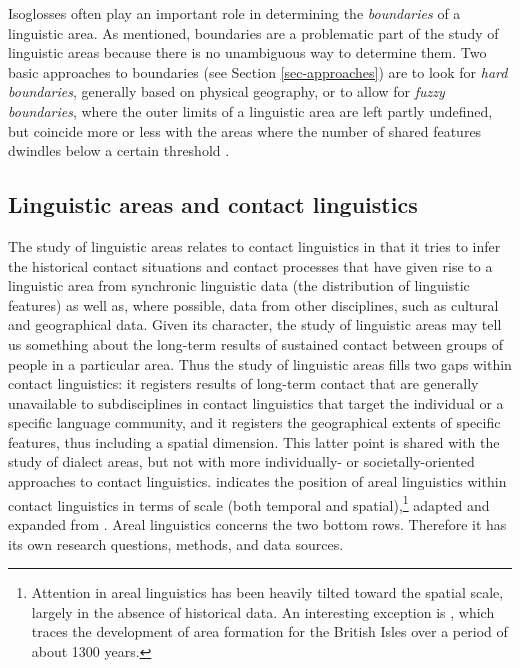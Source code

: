 \documentclass[output=paper]{langscibook}
\begin{document}
Isoglosses often play an important role in determining the \textit{boundaries} of a linguistic area. As mentioned, boundaries are a problematic part of the study of linguistic areas because there is no unambiguous way to determine them. Two basic approaches to boundaries (see Section \ref{sec-approaches}) are to look for \textit{hard boundaries}, generally based on physical geography, or to allow for \textit{fuzzy boundaries}, where the outer limits of a linguistic area are left partly undefined, but coincide more or less with the areas where the number of shared features dwindles below a certain threshold \parencite{Muyskenetal2014Linguistic}.

\subsection{Linguistic areas and contact linguistics} \label{subsec:linguistic areas and contact linguistics}

The study of linguistic areas relates to contact linguistics in that it tries to infer the historical contact situations and contact processes that have given rise to a linguistic area from synchronic linguistic data (the distribution of linguistic features) as well as, where possible, data from other disciplines, such as cultural and geographical data. Given its character, the study of linguistic areas may tell us something about the long-term results of sustained contact between groups of people in a particular area. Thus the study of linguistic areas fills two gaps within contact linguistics: it registers results of long-term contact that are generally unavailable to subdisciplines in contact linguistics that target the individual or a specific language community, and it registers the geographical extents of specific features, thus including a spatial dimension. This latter point is shared with the study of dialect areas,
but not with more individually- or societally-oriented approaches to contact linguistics.  indicates the position of areal linguistics within contact linguistics in terms of scale (both temporal and spatial),\footnote{Attention in areal linguistics has been heavily tilted toward the spatial scale, largely in the absence of historical data. An interesting exception is \textcite{dedioetalforthcevidence}, which traces the development of area formation for the British Isles over a period of about 1300 years.} adapted and expanded from \textcite{muysken2008conceptual}. Areal linguistics concerns the two bottom rows. Therefore it has its own research questions, methods, and data sources.
\end{document}

